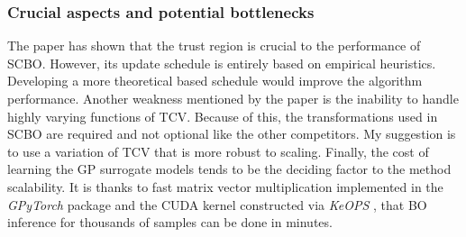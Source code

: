 \subsubsection{Crucial aspects and potential bottlenecks}
The paper has shown that the trust region is crucial to the performance of SCBO. However, its update schedule is entirely based on empirical heuristics. Developing a more theoretical based schedule would improve the algorithm performance. Another weakness mentioned by the paper is the inability to handle highly varying functions of TCV. Because of this, the transformations used in SCBO are required and not optional like the other competitors. My suggestion is to use a variation of TCV that is more robust to scaling. Finally, the cost of learning the GP surrogate models tends to be the deciding factor to the method scalability. It is thanks to fast matrix vector multiplication implemented in the \textit{GPyTorch} package \cite{gardner2018gpytorch} and the CUDA kernel constructed via \textit{KeOPS} \cite{charlierkeops}, that BO inference for thousands of samples can be done in minutes.

